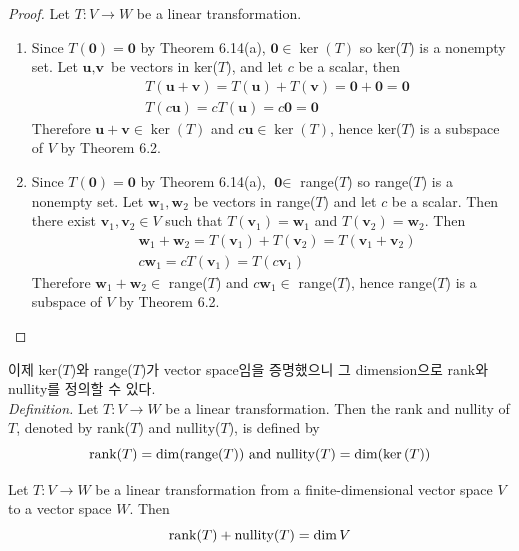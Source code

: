 \begin{proof}
	Let $T: V \rightarrow W$ be a linear transformation.
	\begin{enumerate}
		\item Since $T(\textbf{0}) = \textbf{0}$ by Theorem 6.14(a), $\textbf{0} \in \ker(T)$ so ker($T$) is a nonempty set. Let $\textbf{u}, \textbf{v}$ be vectors in ker($T$), and let $c$ be a scalar, then \begin{align*}
			&T(\textbf{u} + \textbf{v}) = T(\textbf{u}) + T(\textbf{v}) = \textbf{0} + \textbf{0} = \textbf{0} \\
			&T(c\textbf{u}) = cT(\textbf{u}) = c\textbf{0} = \textbf{0}
		\end{align*} Therefore $\textbf{u} + \textbf{v} \in \ker(T)$ and $c\textbf{u} \in \ker(T)$, hence ker($T$) is a subspace of $V$ by Theorem 6.2.
		\item Since $T(\textbf{0}) = \textbf{0}$ by Theorem 6.14(a), $\textbf{0} \in$ range($T$) so range($T$) is a nonempty set. Let $\textbf{w}_1, \textbf{w}_2$ be vectors in range($T$) and let $c$ be a scalar. Then there exist $\textbf{v}_1, \textbf{v}_2 \in V$ such that $T(\textbf{v}_1) = \textbf{w}_1$ and $ T(\textbf{v}_2) = \textbf{w}_2$. Then \begin{align*}
			&\textbf{w}_1 + \textbf{w}_2 = T(\textbf{v}_1) + T(\textbf{v}_2) = T(\textbf{v}_1 + \textbf{v}_2) \\
			&c\textbf{w}_1 = cT(\textbf{v}_1) = T(c\textbf{v}_1)
		\end{align*} Therefore $\textbf{w}_1 + \textbf{w}_2 \in$ range($T$) and $c\textbf{w}_1 \in $ range($T$), hence range($T$) is a subspace of $V$ by Theorem 6.2.
	\end{enumerate}
\end{proof}

이제 ker($T$)와 range($T$)가 vector space임을 증명했으니 그 dimension으로 rank와 nullity를 정의할 수 있다. \\

\textit{Definition.} Let $T: V \rightarrow W$ be a linear transformation. Then the rank and nullity of $T$, denoted by rank($T$) and nullity($T$), is defined by \begin{equation*}
	\textnormal{rank}(T) = \dim(\textnormal{range}(T)) \mbox{ and } \textnormal{nullity}(T) = \dim(\ker{(T)})
\end{equation*}

\begin{theorem}
	Let $T: V \rightarrow W$ be a linear transformation from a finite-dimensional vector space $V$ to a vector space $W$. Then \begin{equation*}
		\textnormal{rank}(T) + \textnormal{nullity}(T) = \dim V
	\end{equation*}
\end{theorem}

